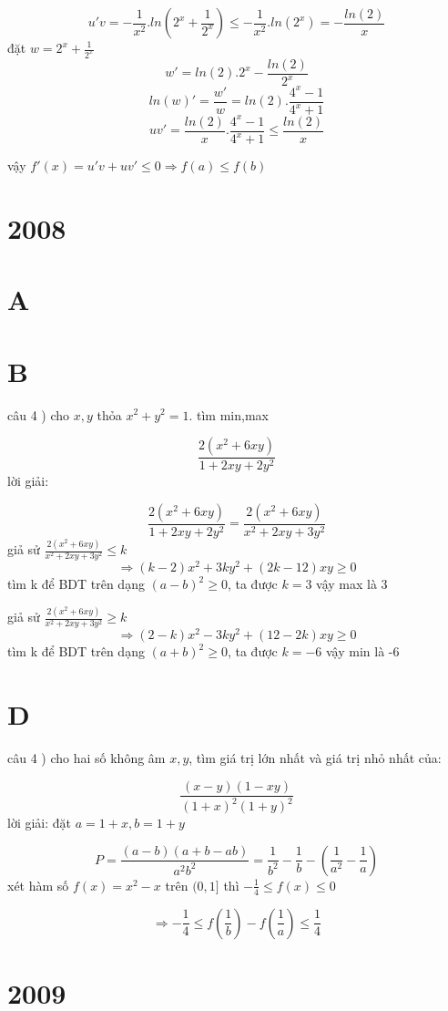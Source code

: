 \documentclass{article}
\begin{document}
\[u'v=-\frac{1}{x^2}.ln(2^x+\frac{1}{2^x})\leq-\frac{1}{x^2}.ln(2^x)=-\frac{ln(2)}{x}\]
đặt $w=2^x+\frac{1}{2^x}$
\[w'=ln(2).2^x-\frac{ln(2)}{2^x}\]
\[ln(w)'=\frac{w'}{w}=ln(2).\frac{4^x-1}{4^x+1}\]
\[uv'=\frac{ln(2)}{x}.\frac{4^x-1}{4^x+1}\leq \frac{ln(2)}{x}\]

vậy $f'(x)=u'v + uv' \leq 0 \Rightarrow f(a)\leq f(b)$ 


\section*{2008}
\section*{A}
\section*{B}

câu 4
) cho $x,y$ thỏa $x^2+y^2=1$. tìm min,max

\[\frac{2(x^2+6xy)}{1+2xy+2y^2}\]
lời giải:

\[\frac{2(x^2+6xy)}{1+2xy+2y^2} = \frac{2(x^2+6xy)}{x^2+2xy+3y^2}\]
giả sử $\frac{2(x^2+6xy)}{x^2+2xy+3y^2}\leq k$
\[\Rightarrow (k-2)x^2+3ky^2+(2k-12)xy\geq 0\]
tìm k để BDT trên dạng $(a-b)^2\geq0$, ta được $k=3$
vậy max là 3

giả sử $\frac{2(x^2+6xy)}{x^2+2xy+3y^2}\geq k$
\[\Rightarrow (2-k)x^2-3ky^2+(12-2k)xy\geq 0\]
tìm k để BDT trên dạng $(a+b)^2\geq0$, ta được $k=-6$
vậy min là -6

\section*{D}

câu 4
) cho hai số không âm $x,y$, tìm giá trị lớn nhất và giá trị nhỏ nhất của:

\[\frac{(x-y)(1-xy)}{(1+x)^2(1+y)^2}\]
lời giải: đặt $a=1+x,b=1+y$

\[P=\frac{(a-b)(a+b-ab)}{a^2b^2}=\frac{1}{b^2}-\frac{1}{b}-(\frac{1}{a^2}-\frac{1}{a})\]
xét hàm số $f(x)=x^2-x$ trên $(0,1]$ thì $-\frac{1}{4}\leq f(x) \leq 0$

\[\Rightarrow -\frac{1}{4}\leq f(\frac{1}{b})-f(\frac{1}{a})\leq \frac{1}{4}\]


\section*{2009}
\end{document}
